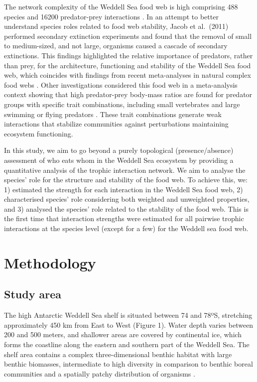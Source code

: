 \documentclass[gc, manuscript]{copernicus}
\begin{document}
The network complexity of the Weddell Sea food web is high comprising
488 species and 16200 predator-prey interactions \citep{Jacob2011}. In
an attempt to better understand species roles related to food web
stability, Jacob et al.~(2011) performed secondary extinction
experiments and found that the removal of small to medium-sized, and not
large, organisms caused a cascade of secondary extinctions. This
findings highlighted the relative importance of predators, rather than
prey, for the architecture, functioning and stability of the Weddell Sea
food web, which coincides with findings from recent meta-analyses in
natural complex food webs \citep{Brose2019, Perkins2022}. Other
investigations considered this food web in a meta-analysis context
showing that high predator-prey body-mass ratios are found for predator
groups with specific trait combinations, including small vertebrates and
large swimming or flying predators \citep{Brose2019}. These trait
combinations generate weak interactions that stabilize communities
against perturbations maintaining ecosystem functioning.

In this study, we aim to go beyond a purely topological
(presence/absence) assessment of who eats whom in the Weddell Sea
ecosystem by providing a quantitative analysis of the trophic
interaction network. We aim to analyse the species' role for the
structure and stability of the food web. To achieve this, we: 1)
estimated the strength for each interaction in the Weddell Sea food web,
2) characterised species' role considering both weighted and unweighted
properties, and 3) analysed the species' role related to the stability
of the food web. This is the first time that interaction strengths were
estimated for all pairwise trophic interactions at the species level
(except for a few) for the Weddell sea food web.

\section{Methodology}

\subsection{Study area}

The high Antarctic Weddell Sea shelf is situated between 74 and 78ºS,
stretching approximately 450 km from East to West (Figure 1). Water
depth varies between 200 and 500 meters, and shallower areas are covered
by continental ice, which forms the coastline along the eastern and
southern part of the Weddell Sea. The shelf area contains a complex
three-dimensional benthic habitat with large benthic biomasses,
intermediate to high diversity in comparison to benthic boreal
communities and a spatially patchy distribution of organisms
\citep{Dayton1990, Teixido2002}.
\end{document}
